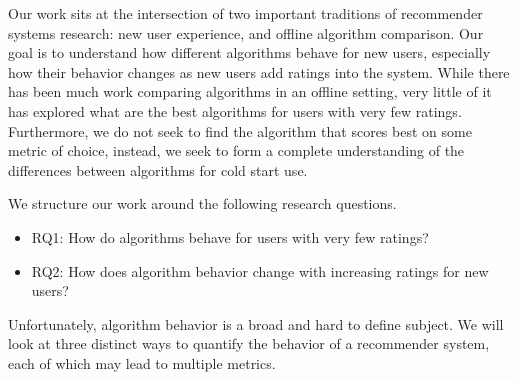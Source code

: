 \documentclass[letterpaper]{sig-alternate}
\begin{document}
  Our work sits at the intersection of two important traditions of recommender systems research: new user experience, and offline algorithm comparison.
  Our goal is to understand how different algorithms behave for new users, especially how their behavior changes as new users add ratings into the system.
  While there has been much work comparing algorithms in an offline setting, very little of it has explored what are the best algorithms for users with very few ratings.
  Furthermore, we do not seek to find the algorithm that scores best on some metric of choice, instead, we seek to form a complete understanding of the differences between algorithms for cold start use.

  We structure our work around the following research questions.
  \begin{itemize}
    \item RQ1: How do algorithms behave for users with very few ratings?
    \item RQ2: How does algorithm behavior change with increasing ratings for new users?
  \end{itemize}
  Unfortunately, algorithm behavior is a broad and hard to define subject.
  We will look at three distinct ways to quantify the behavior of a recommender system, each of which may lead to multiple metrics.

\end{document}
